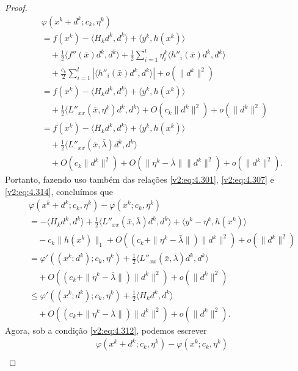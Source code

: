 \begin{proof}
    \begin{align*}
        &\varphi(x^k + d^k; c_k, \eta^k) \\
        &= f(x^k) - \langle H_k d^k, d^k \rangle + \langle y^k, h(x^k) \rangle \\
        &\quad + \frac{1}{2}\langle f''(\bar{x})d^k, d^k \rangle + \frac{1}{2}\sum_{i=1}^l \eta_i^k \langle h''_i(\bar{x})d^k, d^k \rangle \\
        &\quad + \frac{c_k}{2} \sum_{i=1}^l |\langle h''_i(\bar{x})d^k, d^k \rangle| + o(\|d^k\|^2) \\
        &= f(x^k) - \langle H_k d^k, d^k \rangle + \langle y^k, h(x^k) \rangle \\
        &\quad + \frac{1}{2} \langle L''_{xx}(\bar{x}, \eta^k)d^k, d^k \rangle + O(c_k \|d^k\|^2) + o(\|d^k\|^2) \\
        &= f(x^k) - \langle H_k d^k, d^k \rangle + \langle y^k, h(x^k) \rangle \\
        &\quad + \frac{1}{2} \langle L''_{xx}(\bar{x}, \bar{\lambda})d^k, d^k \rangle \\
        &\quad + O(c_k \|d^k\|^2) + O(\|\eta^k - \bar{\lambda}\|\|d^k\|^2) + o(\|d^k\|^2).
    \end{align*}
    Portanto, fazendo uso também das relações \eqref{v2:eq:4.301}, \eqref{v2:eq:4.307} e \eqref{v2:eq:4.314}, concluímos que
    \begin{align*}
        &\varphi(x^k + d^k; c_k, \eta^k) - \varphi(x^k; c_k, \eta^k) \\
        &= -\langle H_k d^k, d^k \rangle + \frac{1}{2}\langle L''_{xx}(\bar{x}, \bar{\lambda})d^k, d^k \rangle + \langle y^k - \eta^k, h(x^k) \rangle \\
        &\quad - c_k\|h(x^k)\|_1 + O((c_k + \|\eta^k - \bar{\lambda}\|)\|d^k\|^2) + o(\|d^k\|^2) \\
        &= \varphi'((x^k; d^k); c_k, \eta^k) + \frac{1}{2}\langle L''_{xx}(\bar{x}, \bar{\lambda})d^k, d^k \rangle \\
        &\quad + O((c_k + \|\eta^k - \bar{\lambda}\|)\|d^k\|^2) + o(\|d^k\|^2) \\
        &\le \varphi'((x^k; d^k); c_k, \eta^k) + \frac{1}{2}\langle H_k d^k, d^k \rangle \\
        &\quad + O((c_k + \|\eta^k - \bar{\lambda}\|)\|d^k\|^2) + o(\|d^k\|^2).
    \end{align*}
    Agora, sob a condição \eqref{v2:eq:4.312}, podemos escrever
    \begin{align*}
        &\varphi(x^k + d^k; c_k, \eta^k) - \varphi(x^k; c_k, \eta^k) \\

\end{align*}
\end{proof}
